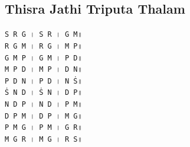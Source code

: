 \documentclass[12pt]{article}
\newcommand{\df}[1]{{\devanagarifont#1}}
\begin{document}
\subsection{Thisra Jathi Triputa Thalam}
\texttt{S~R~G~\df{।}~S~\hspace{0.5em}R~\df{।}~G~\hspace{0.5em}M\df{॥}}\\
\texttt{R~G~M~\df{।}~R~\hspace{0.5em}G~\df{।}~M~\hspace{0.5em}P\df{॥}}\\
\texttt{G~M~P~\df{।}~G~\hspace{0.5em}M~\df{।}~P~\hspace{0.5em}D\df{॥}}\\
\texttt{M~P~D~\df{।}~M~\hspace{0.5em}P~\df{।}~D~\hspace{0.5em}N\df{॥}}\\
\texttt{P~D~N~\df{।}~P~\hspace{0.5em}D~\df{।}~N~\hspace{0.5em}Ṡ\df{॥}}\\
\texttt{Ṡ~N~D~\df{।}~Ṡ~\hspace{0.5em}N~\df{।}~D~\hspace{0.5em}P\df{॥}}\\
\texttt{N~D~P~\df{।}~N~\hspace{0.5em}D~\df{।}~P~\hspace{0.5em}M\df{॥}}\\
\texttt{D~P~M~\df{।}~D~\hspace{0.5em}P~\df{।}~M~\hspace{0.5em}G\df{॥}}\\
\texttt{P~M~G~\df{।}~P~\hspace{0.5em}M~\df{।}~G~\hspace{0.5em}R\df{॥}}\\
\texttt{M~G~R~\df{।}~M~\hspace{0.5em}G~\df{।}~R~\hspace{0.5em}S\df{॥}}\\
\end{document}
